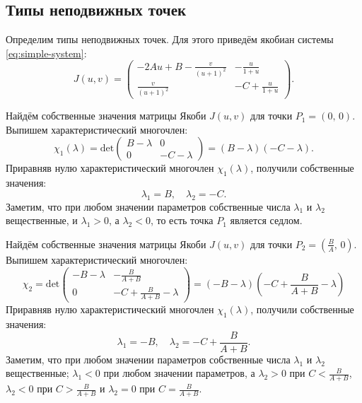 \documentclass[a4paper, 11pt]{article}
\begin{document}
	\subsection{Типы неподвижных точек}
	Определим типы неподвижных точек.
	Для этого приведём якобиан системы \eqref{eq:simple-system}:
	\begin{equation}
		J(u, v) =
		\begin{pmatrix}
			-2Au+B-\frac{v}{(u+1)^2} & -\frac{u}{1 + u} \\
			\frac{v}{(u+1)^2}       & -C +\frac{u}{1 + u}
		\end{pmatrix}.
	\end{equation}

	Найдём собственные значения матрицы Якоби $J(u,v)$ для точки $P_1 = (0,\,0)$. Выпишем характеристический многочлен:
	$$
		\chi_{1}(\lambda)
		=
		\mathrm{det} \begin{pmatrix}
			B - \lambda & 0 \\
			0           & -C -\lambda
		\end{pmatrix}
		=
		(B - \lambda)(-C - \lambda).
	$$
	Приравняв нулю характеристический многочлен $\chi_1(\lambda)$, получили собственные значения:
	$$
	       \lambda_1 = B, \quad \lambda_2 = -C.	
	$$
	Заметим, что при любом значении параметров собственные числа $\lambda_1$ и $\lambda_2$ вещественные, и $\lambda_1 > 0$, а $\lambda_2 < 0$, то есть точка $P_1$ является седлом.

        \begin{figure}[h]
                \centering
                
        \end{figure}
	Найдём собственные значения матрицы Якоби $J(u,v)$ для точки $P_2 = \left(\frac{B}{A},\,0\right)$. Выпишем характеристический многочлен:
	$$
                \chi_2=\mathrm{det}\begin{pmatrix}
                        -B - \lambda & -\frac{B}{A+B} \\
                        0 & -C + \frac{B}{A+B} - \lambda
                \end{pmatrix}
                =
                (-B - \lambda)\left(
                        -C + \frac{B}{A+B} - \lambda
                \right)
        $$
        Приравняв нулю характеристический многочлен $\chi_1(\lambda)$, получили собственные значения:
        $$
               \lambda_1 = -B, \quad \lambda_2 = -C + \frac{B}{A+B}.     
        $$
        Заметим, что при любом значении параметров собственные числа $\lambda_1$ и $\lambda_2$ вещественные; $\lambda_1 < 0$ при любом значении параметров, а $\lambda_2 > 0$ при $C < \frac{B}{A+B}$, $\lambda_2 < 0$ при $C > \frac{B}{A+B}$ и $\lambda_2 = 0$ при $C = \frac{B}{A+B}$.
\end{document}
